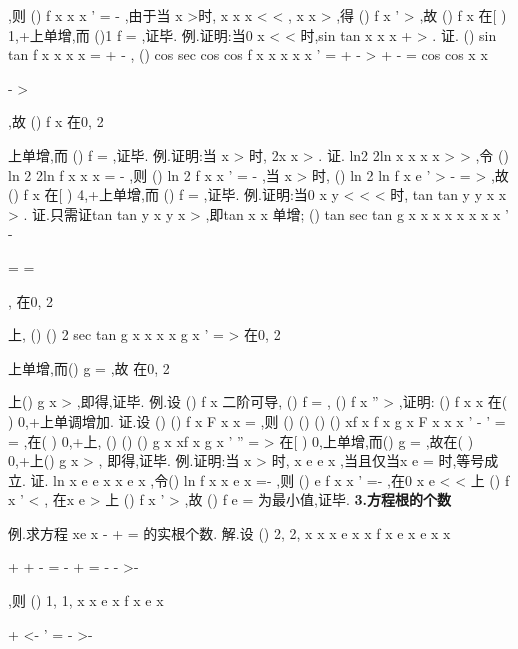 ,则
()
f
x
x
x
'
=
-
,由于当
x >时,
x
x
x
<
<
, 
x
x
>
,得
()
f
x
'
>
,故
()
f x 在[
)
1,+\infty 上单增,而
()1
f
=
,证毕. 
\textcolor{lyred}{例}.证明:当0
x
\pi 
<
<
时,sin
tan
x
x
x
+
>
. 
证.
()
sin
tan
f x
x
x
x
=
+
-
,
()
cos
sec
cos
cos
f
x
x
x
x
x
'
=
+
-
>
+
-
= 
cos
cos
x
x


-
>




,故
()
f x 在0, 2
\pi 





上单增,而
()
f
=
,证毕. 
\textcolor{lyred}{例}.证明:当
x >
时,
2x
x
>
. 
证.
ln2
2ln
x
x
x
x
>
\Leftrightarrow 
>
,令
()
ln 2
2ln
f x
x
x
=
-
,则
()
ln 2
f
x
x
'
=
-
,当
x >
时, 
()
ln 2
ln
f
x
e
'
>
-
=
>
,故
()
f x 在[
)
4,+\infty 上单增,而
()
f
=
,证毕. 
\textcolor{lyred}{例}.证明:当0
x
y
\pi 
<
<
<
时, tan
tan
y
y
x
x
>
. 
证.只需证tan
tan
y
x
y
x
>
,即tan x
x
单增;
()
tan
sec
tan
g x
x
x
x
x
x
x
x
'
-

=
=




, 
在0, 2
\pi 






上,
()
()
2 sec
tan
g
x
x
x
x
g x
'
=
>
\Rightarrow 
在0, 2
\pi 





上单增,而()
g
=
,故 
在0, 2
\pi 






上()
g x >
,即得,证毕. 
\textcolor{lyred}{例}.设
()
f x 二阶可导,
()
f
=
,
()
f
x
''
>
,证明:
()
f x
x
在(
)
0,+\infty 上单调增加. 
证.设
()
()
f x
F x
x
=
,则
()
()
()
()
xf
x
f x
g x
F
x
x
x
'
-
'
=
=
,在(
)
0,+\infty 上, 
()
()
()
g
x
xf
x
g x
'
''
=
>
\Rightarrow 
在[
)
0,\infty 上单增,而()
g
=
,故在(
)
0,+\infty 上()
g x >
, 
即得,证毕. 
\textcolor{lyred}{例}.证明:当
x >
时,
x
e
e
x
\ge 
,当且仅当x
e
=
时,等号成立. 
证.
ln
x
e
e
x
x
e
x
\ge 
\Leftrightarrow 
\ge 
,令()
ln
f x
x e
x
=-
,则
()
e
f
x
x
'
=-
,在0
x
e
<
<
上
()
f
x
'
<
, 
在x
e
>
上
()
f
x
'
>
,故
()
f e =
为最小值,证毕. 
{\bfseries \textcolor{lyred}{3.方程根的个数}}

\textcolor{lyred}{例}.求方程
xe
x
-
+
=
的实根个数. 
解.设
()
2,
2,
x
x
x
e
x
x
f x
e
x
e
x
x

+
+
\le -
=
-
+
=
-
-
>-

,则
()
1,
1,
x
x
e
x
f
x
e
x

+
<-
'
=
-
>-

